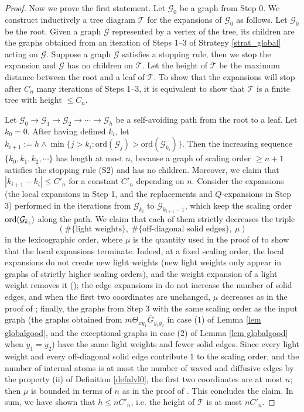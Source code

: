 \documentclass{article}
\newcommand{\1}{\mathds{1}}
\numberwithin{equation}{section}
\newcommand{\ord}{{\rm{ord}}}
\renewcommand{\cal}{\mathcal}
\renewcommand{\leq}{\leqslant}
\renewcommand{\geq}{\geqslant}
\renewcommand{\le}{\leq}
\renewcommand{\ge}{\geq}
\newcommand{\dashed}{\text{diffusive}}
\theoremstyle{plain} %
\theoremstyle{remark}
\begin{document}
\begin{proof}
Now we prove the first statement. Let $\cal G_0$ be a graph from Step 0. We construct inductively a tree diagram $\cal T$ for the  expansions of $\cal G_0$ as follows. Let $\cal G_0$ be the root. Given a graph $\cal G$ represented by a vertex of the tree, its children are the graphs obtained from an iteration of Steps 1--3 of Strategy \ref{strat_global} acting on $\cal G$. Suppose a graph $\cal G$ satisfies a stopping rule, then we stop the expansion and $\cal G$ has no children on $\cal T$. Let the height of $\cal T$ be the maximum distance between the root and a leaf of $\cal T$. To show that the expansions will stop after $C_n$ many iterations of Steps 1--3, it is equivalent to show that $\cal T$ is a finite tree with height $\le C_n$.
	
Let $\cal G_0 \to \cal G_1 \to \cal G_2 \to \cdots \to \cal G_h$ be a self-avoiding path from the root to a leaf. Let $k_0=0$. After having defined $k_i$, let $k_{i+1}:=h\wedge \min\{j> k_i : \text{ord}(\cal G_j) > \text{ord}(\cal G_{k_i})\}$. Then the increasing sequence $\{k_0,k_1, k_2, \cdots\}$ has length at most $n$, because a graph of scaling order $\ge n+1$ satisfies the stopping rule (S2) and has no children. Moreover, we claim that $|k_{i+1}-k_i|\le C'_n$ for a constant $C'_n$ depending on $n$. Consider the expansions (the local expansions in Step 1, and the replacements and $Q$-expansions in Step 3) performed in the iterations from $\cal G_{k_i}$ to $\cal G_{k_{i+1}-1}$, which keep the scaling order $\ord(\cal G_{k_i})$ along the path. We claim that each of them strictly decreases the triple
$$\left(\#\{\text{light weights}\},\ \#\{\text{off-diagonal solid edges}\},\ \mu\right)$$
in the lexicographic order, where $\mu$ is the quantity used in the proof of \cite[Lemma 3.22]{PartI_high} to show that the local expansions terminate. Indeed, at a fixed scaling order, the local expansions do not create new light weights (new light weights only appear in graphs of strictly higher scaling orders), and the weight expansion of a light weight removes it (\cite[Lemma 3.9 (b)]{PartI_high}); the edge expansions in \cite[Lemmas 3.13, 3.16 and 3.19]{PartI_high} do not increase the number of solid edges, and when the first two coordinates are unchanged, $\mu$ decreases as in the proof of \cite[Lemma 3.22]{PartI_high}; finally, the graphs from Step 3 with the same scaling order as the input graph (the graphs obtained from $m\Theta_{xy_1}\overline G_{y_1y_2}$ in case (1) of Lemma \ref{lem globalgood}, and the exceptional graphs in case (2) of Lemma \ref{lem globalgood} when $y_1=y_2$) have the same light weights and fewer solid edges. Since every light weight and every off-diagonal solid edge contribute $1$ to the scaling order, and the number of internal atoms is at most the number of waved and $\dashed$ edges by the property (ii) of Definition \ref{defnlvl0}, the first two coordinates are at most $n$; then $\mu$ is bounded in terms of $n$ as in the proof of \cite[Lemma 3.22]{PartI_high}. This concludes the claim. In sum, we have shown that $h\le nC'_n$, i.e. the height of $\cal T$ is at most $nC'_n$.
\end{proof}
\end{document}
